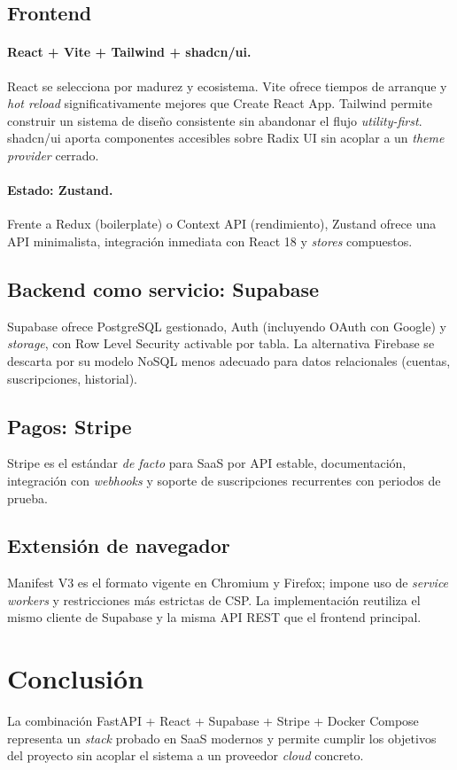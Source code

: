 \subsection{Frontend}

\paragraph{React + Vite + Tailwind + shadcn/ui.} React se selecciona
por madurez y ecosistema. Vite ofrece tiempos de arranque y \emph{hot
reload} significativamente mejores que Create React App. Tailwind
permite construir un sistema de diseño consistente sin abandonar el
flujo \emph{utility-first}. shadcn/ui aporta componentes accesibles
sobre Radix UI sin acoplar a un \emph{theme provider} cerrado.

\paragraph{Estado: Zustand.} Frente a Redux (boilerplate) o Context API
(rendimiento), Zustand ofrece una API minimalista, integración
inmediata con React 18 y \emph{stores} compuestos.

\subsection{Backend como servicio: Supabase}

Supabase ofrece PostgreSQL gestionado, Auth (incluyendo OAuth con
Google) y \emph{storage}, con Row Level Security activable por tabla.
La alternativa Firebase se descarta por su modelo NoSQL menos adecuado
para datos relacionales (cuentas, suscripciones, historial).

\subsection{Pagos: Stripe}

Stripe es el estándar \emph{de facto} para SaaS por API estable,
documentación, integración con \emph{webhooks} y soporte de
suscripciones recurrentes con periodos de prueba.

\subsection{Extensión de navegador}

Manifest V3 es el formato vigente en Chromium y Firefox; impone uso de
\emph{service workers} y restricciones más estrictas de CSP. La
implementación reutiliza el mismo cliente de Supabase y la misma API
REST que el frontend principal.

\section{Conclusión}

La combinación FastAPI + React + Supabase + Stripe + Docker Compose
representa un \emph{stack} probado en SaaS modernos y permite cumplir
los objetivos del proyecto sin acoplar el sistema a un proveedor
\emph{cloud} concreto.
